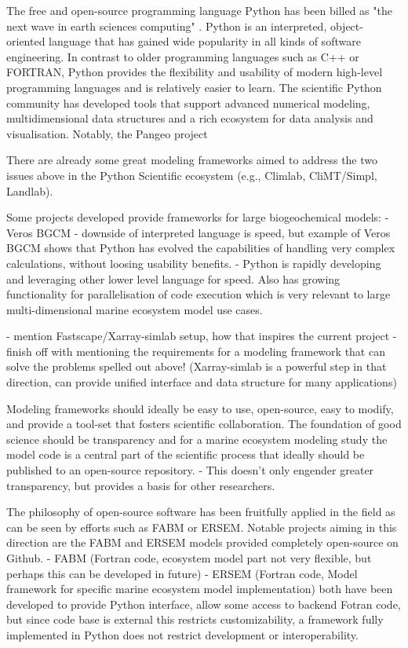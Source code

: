 \documentclass[journal abbreviation, manuscript]{copernicus}
\begin{document}
The free and open-source programming language Python has been billed as "the next wave in earth sciences computing" \citep{Lin2012}. Python is an interpreted, object-oriented language that has gained wide popularity in all kinds of software engineering. In contrast to older programming languages such as C++ or FORTRAN, Python provides the flexibility and usability of modern high-level programming languages and is relatively easier to learn.
The scientific Python community has developed tools that support advanced numerical modeling, multidimensional data structures and a rich ecosystem for data analysis and visualisation.
Notably, the Pangeo project 


There are already some great modeling frameworks aimed to address the two issues above in the Python Scientific ecosystem (e.g., Climlab, CliMT/Simpl, Landlab).

Some projects developed provide frameworks for large biogeochemical models:
- Veros BGCM
- downside of interpreted language is speed, but example of Veros BGCM shows that Python has evolved the capabilities of handling very complex calculations, without loosing usability benefits.
- Python is rapidly developing and leveraging other lower level language for speed. Also has growing functionality for parallelisation of code execution which is very relevant to large multi-dimensional marine ecosystem model use cases. 

- mention Fastscape/Xarray-simlab setup, how that inspires the current project
- finish off with mentioning the requirements for a modeling framework that can solve the problems spelled out above! (Xarray-simlab is a powerful step in that direction, can provide unified interface and data structure for many applications)


Modeling frameworks should ideally be easy to use, open-source, easy to modify, and provide a tool-set that fosters scientific collaboration. The foundation of good science should be transparency and for a marine ecosystem modeling study the model code is a central part of the scientific process that ideally should be published to an open-source repository. 
- This doesn't only engender greater transparency, but provides a basis for other researchers.

The philosophy of open-source software has been fruitfully applied in the field as can be seen by efforts such as FABM or ERSEM.
Notable projects aiming in this direction are the FABM and ERSEM models provided completely open-source on Github.
- FABM (Fortran code, ecosystem model part not very flexible, but perhaps this can be developed in future)
- ERSEM (Fortran code, Model framework for specific marine ecosystem model implementation)
both have been developed to provide Python interface, allow some access to backend Fotran code, but since code base is external this restricts customizability, a framework fully implemented in Python does not restrict development or interoperability.
\end{document}
